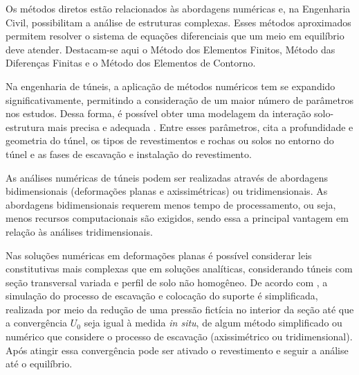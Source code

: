 Os métodos diretos estão relacionados às abordagens numéricas e, na Engenharia Civil, possibilitam a análise de estruturas complexas. Esses métodos aproximados permitem resolver o sistema de equações diferenciais que um meio em equilíbrio deve atender. Destacam-se aqui o Método dos Elementos Finitos, Método das Diferenças Finitas e o Método dos Elementos de Contorno.

Na engenharia de túneis, a aplicação de métodos numéricos tem se expandido significativamente, permitindo a consideração de um maior número de parâmetros nos estudos. Dessa forma, é possível obter uma modelagem da interação solo-estrutura mais precisa e adequada \cite{Marques2014}. Entre esses parâmetros,  cita a profundidade e geometria do túnel, os tipos de revestimentos e rochas ou solos no entorno do túnel e as fases de escavação e instalação do revestimento.

As análises numéricas de túneis podem ser realizadas através de abordagens bidimensionais (deformações planas e axissimétricas) ou tridimensionais. As abordagens bidimensionais requerem menos tempo de processamento, ou seja, menos recursos computacionais são exigidos, sendo essa a principal vantagem em relação às análises tridimensionais.

Nas soluções numéricas em deformações planas é possível considerar leis constitutivas mais complexas que em soluções analíticas, considerando túneis com seção transversal variada e perfil de solo não homogêneo. De acordo com , a simulação do processo de escavação e colocação do suporte é simplificada, realizada por meio da redução de uma pressão fictícia no interior da seção até que a convergência $U_0$ seja igual à medida \textit{in situ}, de algum método simplificado ou numérico que considere o processo de escavação (axissimétrico ou tridimensional). Após atingir essa convergência pode ser ativado o revestimento e seguir a análise até o equilíbrio.


